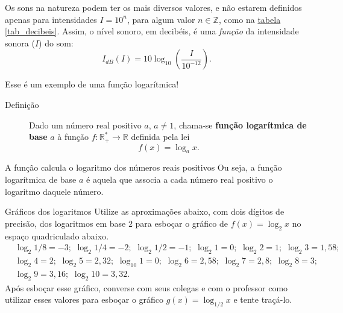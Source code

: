 
Os sons na natureza podem ter os mais diversos valores, e não estarem definidos apenas para intensidades $I = 10^n$, para algum valor $n \in \mathbb{Z}$, como na \hyperref[tab_decibeis]{tabela \ref{tab_decibeis}}. Assim, o nível sonoro, em decibéis, é uma \textit{função} da intensidade sonora ($I$) do som:
$$
I_{dB}(I) = 10 \log_{10} \left(\frac{I}{10^{-12}}\right).
$$

Esse é um exemplo de uma função logarítmica!

\begin{description}
\item[Definição]\label{teo_mud_base}
Dado um número real positivo $a$, $a \neq 1$, chama-se \textbf{função logarítmica de base} $a$ à função $f: \mathbb{R}_+^* \to \mathbb{R}$ definida pela lei
$$
f(x) = \log_a x.
$$
\end{description}

\begin{observation}{A função calcula o logaritmo dos números reais positivos}
Ou seja, a função logarítmica de base $a$ é aquela que associa a cada número real positivo o logaritmo daquele número.
\end{observation}


\begin{task}{Gráficos dos logaritmos}
Utilize as aproximações abaixo, com dois dígitos de precisão, dos logaritmos em base $2$ para esboçar o gráfico de $f(x) = \log_{2} x$ no espaço quadriculado abaixo.
\begin{align*}
& \log_{2} 1/8 = -3; \,\, \log_{2} 1/4 = -2; \,\, \log_{2} 1/2 = -1; \,\, \log_{2} 1 = 0; \,\, \log_{2} 2  = 1; \,\, \log_{2} 3  =  1{,}58; \,\,\\
& \log_{2} 4  = 2; \,\, \log_{2} 5 = 2{,}32; \,\, \log_{10} 1 = 0; \,\, \log_{2} 6 = 2{,}58; \,\, \log_{2} 7  = 2{,}8; \,\, \log_{2} 8  = 3; \,\,\\
& \log_{2} 9  = 3{,}16; \,\, \log_{2} 10  = 3{,}32.
\end{align*}
Após esboçar esse gráfico, converse com seus colegas e com o professor como utilizar esses valores para esboçar o gráfico $g(x) = \log_{1/2} x$ e tente traçá-lo.

\begin{figure}[H]
\centering

\end{figure}
\end{task}

